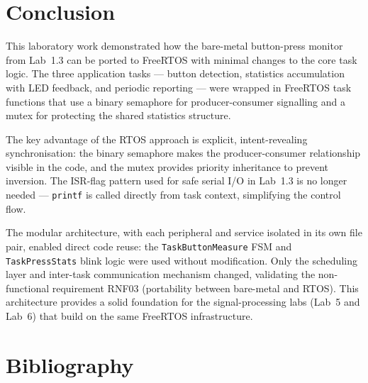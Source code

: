 \documentclass[12pt]{article}
\begin{document}
\section{Conclusion}

\hspace{0.8cm}
This laboratory work demonstrated how the bare-metal button-press monitor from Lab~1.3 can be ported to FreeRTOS with minimal changes to the core task logic. The three application tasks — button detection, statistics accumulation with LED feedback, and periodic reporting — were wrapped in FreeRTOS task functions that use a binary semaphore for producer-consumer signalling and a mutex for protecting the shared statistics structure.

\hspace{0.8cm}
The key advantage of the RTOS approach is explicit, intent-revealing synchronisation: the binary semaphore makes the producer-consumer relationship visible in the code, and the mutex provides priority inheritance to prevent inversion. The ISR-flag pattern used for safe serial I/O in Lab~1.3 is no longer needed — \texttt{printf} is called directly from task context, simplifying the control flow.

\hspace{0.8cm}
The modular architecture, with each peripheral and service isolated in its own file pair, enabled direct code reuse: the \texttt{TaskButtonMeasure} FSM and \texttt{TaskPressStats} blink logic were used without modification. Only the scheduling layer and inter-task communication mechanism changed, validating the non-functional requirement RNF03 (portability between bare-metal and RTOS). This architecture provides a solid foundation for the signal-processing labs (Lab~5 and Lab~6) that build on the same FreeRTOS infrastructure.

\section{Bibliography}

\begingroup
\makeatletter
\renewcommand{\section}[2]{}
\makeatother
\end{document}
